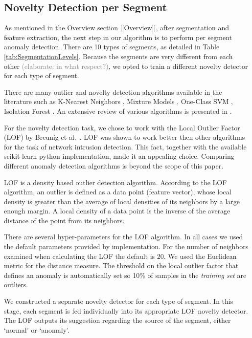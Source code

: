 \documentclass[conference]{IEEEtran}
\begin{document}
\subsection{Novelty Detection per Segment}
  As mentioned in the Overview section [\ref{Overview}], after segmentation and feature  extraction, the next step in our algorithm is to perform per segment anomaly  detection. There are 10 types of segments, as detailed in Table \ref{tab:SegmentationLevels}. Because the segments are very different from each other \textcolor{gray}{(elaborate: in what respect?)}, we opted to train a different novelty detector for each type of segment.
  
  There are many outlier and novelty detection algorithms available in the literature such as K-Nearest Neighbors \cite{hautamaki2004outlier}, Mixture Models \cite{}, One-Class SVM \cite{}, Isolation Forest \cite{liu2008isolation}. An extensive review of various algorithms is presented in \cite{pimentel2014review}.
  
  For the novelty detection task, we chose to work with the Local Outlier Factor (LOF) by Breunig et al.\ \cite{breunig2000lof}. LOF was shown to work better then other algorithms for the task of network intrusion detection\cite{lazarevic2003comparative}. This fact, together with the available scikit-learn \cite{scikit-learn} python implementation, made it an appealing choice. Comparing different anomaly detection algorithms is beyond the scope of this paper.
  
  LOF is a density based outlier detection algorithm. According to the LOF algorithm, an outlier is defined as a data point (feature vector), whose local density is greater than the average of local densities of its neighbors by a large enough margin. A local density of a data point is the inverse of the average distance of the point from its neighbors.
  
  There are several hyper-parameters for the LOF algorithm. In all cases we used the default parameters provided by implementation. For the number of neighbors examined when calculating the LOF the default is 20. We used the Euclidean metric for the distance measure. The threshold on the local outlier factor that defines an anomaly is automatically set so 10\% of samples in the \textit{training set} are outliers.
  
  We constructed a separate novelty detector for each type of segment. In this stage, each segment is fed individually into its appropriate LOF novelty detector. The LOF outputs its suggestion regarding the source of the segment, either `normal' or `anomaly'.
  
\end{document}

